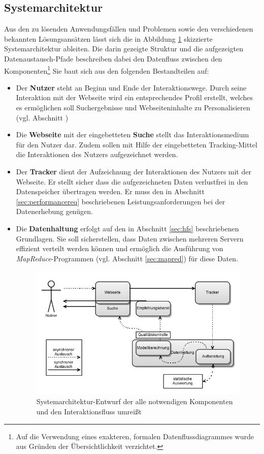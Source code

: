 \subsection{Systemarchitektur}

Aus den zu lösenden Anwendungsfällen und Problemen sowie den verschiedenen bekannten Lösungsansätzen lässt sich die in Abbildung \ref{fig:system_rough} skizzierte Systemarchitektur ableiten. Die darin gezeigte Struktur und die aufgezeigten Datenaustausch-Pfade beschreiben dabei den Datenfluss zwischen den Komponenten\footnote{Auf die Verwendung eines exakteren, formalen Datenflussdiagrammes wurde aus Gründen der Übersichtlichkeit verzichtet.} Sie baut sich aus den folgenden Bestandteilen auf:

\begin{itemize}
\item Der \textbf{Nutzer} steht an Beginn und Ende der Interaktionswege. Durch seine Interaktion mit der Webseite wird ein entsprechendes Profil erstellt, welches es ermöglichen soll Suchergebnisse und Webseiteninhalte  zu Personalisieren (vgl. Abschnitt \label{sec:userstories})
\item Die \textbf{Webseite} mit der eingebetteten \textbf{Suche} stellt das Interaktionsmedium für den Nutzer dar. Zudem sollen mit Hilfe der eingebetteten Tracking-Mittel die Interaktionen des Nutzers aufgezeichnet werden.
\item Der \textbf{Tracker} dient der Aufzeichnung der Interaktionen des Nutzers mit der Webseite. Er stellt sicher dass die aufgezeichneten Daten verlustfrei in den Datenspeicher übertragen werden. Er muss den in Abschnitt \ref{sec:performancereq} beschriebenen Leistungsanforderungen bei der Datenerhebung genügen.
\item Die \textbf{Datenhaltung} erfolgt auf den in Abschnitt \ref{sec:hfs} beschriebenen Grundlagen. Sie soll sicherstellen, dass Daten zwischen mehreren  Servern effizient verteilt werden können und ermöglich die Ausführung von \textit{MapReduce}-Programmen (vgl. Abschnitt \ref{sec:mapred}) für diese Daten.

\begin{figure}[H]
  \centering
    \includegraphics[width=\textwidth]{Abbildungen/Systemmodell.png}
    \caption[Systenarchitektur]{\footnotesize Systemarchitektur-Entwurf der alle notwendigen Komponenten und den Interaktionsfluss umreißt}
    \label{fig:system_rough}
\end{figure}


\end{itemize}
